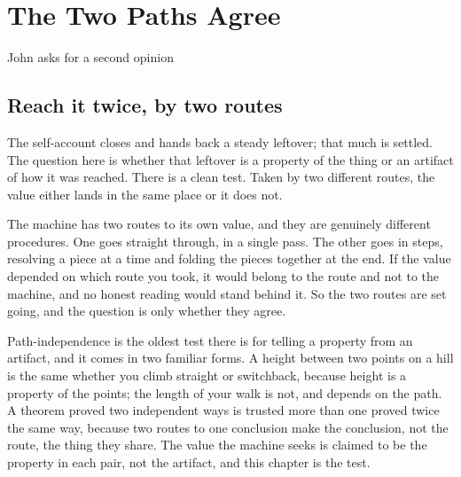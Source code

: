 \chapter{The Two Paths Agree}

\begin{chorus}{John asks for a second opinion}
\end{chorus}

\section{Reach it twice, by two routes}

The self-account closes and hands back a steady leftover; that much is settled.
The question here is whether that leftover is a property of the thing or an artifact of how it was reached.
There is a clean test.
Taken by two different routes, the value either lands in the same place or it does not.

The machine has two routes to its own value, and they are genuinely different procedures.
One goes straight through, in a single pass.
The other goes in steps, resolving a piece at a time and folding the pieces together at the end.
If the value depended on which route you took, it would belong to the route and not to the machine, and no honest reading
would stand behind it.
So the two routes are set going, and the question is only whether they agree.

Path-independence is the oldest test there is for telling a property from an artifact, and it comes in two familiar
forms.
A height between two points on a hill is the same whether you climb straight or switchback, because height is a property
of the points; the length of your walk is not, and depends on the path.
A theorem proved two independent ways is trusted more than one proved twice the same way, because two routes to one
conclusion make the conclusion, not the route, the thing they share.
The value the machine seeks is claimed to be the property in each pair, not the artifact, and this chapter is the test.

